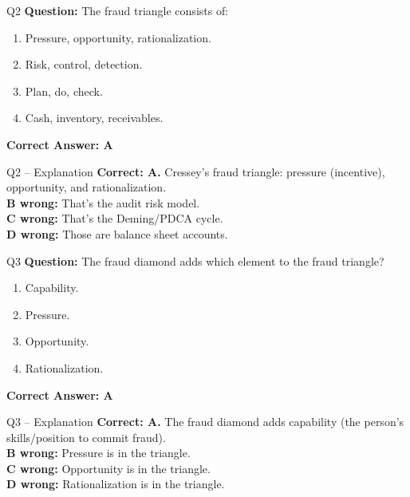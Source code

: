 \documentclass[aspectratio=169,10pt]{beamer}
\begin{document}
	\begin{frame}[t]{Q2}
		\small
		\textbf{Question:} The fraud triangle consists of:
		\begin{enumerate}[label=\Alph*.,itemsep=1pt,topsep=2pt]
			\item Pressure, opportunity, rationalization.
			\item Risk, control, detection.
			\item Plan, do, check.
			\item Cash, inventory, receivables.
		\end{enumerate}
		\vspace{4pt}
		\textbf{Correct Answer: A}
	\end{frame}
	
	\begin{frame}[t]{Q2 -- Explanation}
		\small
		\textbf{Correct: A.} Cressey's fraud triangle: pressure (incentive), opportunity, and rationalization. \\[4pt]
		\textbf{B wrong:} That's the audit risk model. \\[2pt]
		\textbf{C wrong:} That's the Deming/PDCA cycle. \\[2pt]
		\textbf{D wrong:} Those are balance sheet accounts.
	\end{frame}
	
	\begin{frame}[t]{Q3}
		\small
		\textbf{Question:} The fraud diamond adds which element to the fraud triangle?
		\begin{enumerate}[label=\Alph*.,itemsep=1pt,topsep=2pt]
			\item Capability.
			\item Pressure.
			\item Opportunity.
			\item Rationalization.
		\end{enumerate}
		\vspace{4pt}
		\textbf{Correct Answer: A}
	\end{frame}
	
	\begin{frame}[t]{Q3 -- Explanation}
		\small
		\textbf{Correct: A.} The fraud diamond adds capability (the person's skills/position to commit fraud). \\[4pt]
		\textbf{B wrong:} Pressure is in the triangle. \\[2pt]
		\textbf{C wrong:} Opportunity is in the triangle. \\[2pt]
		\textbf{D wrong:} Rationalization is in the triangle.
	\end{frame}
	
\end{document}
